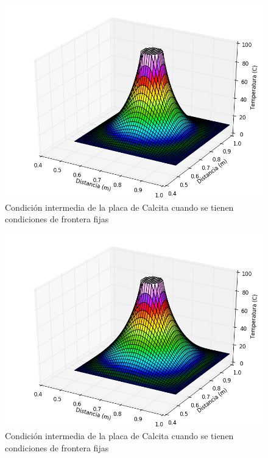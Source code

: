 \documentclass[]{article}
\begin{document}
\begin{figure}[H]
    \centering
    \includegraphics[width=\linewidth]{placafijaintermedio1.png}
    \caption{Condición intermedia de la placa de Calcita cuando se tienen condiciones de frontera fijas}
    \label{fig:placafijaintermedio1}
\end{figure}

\begin{figure}[H]
    \centering
    \includegraphics[width=\linewidth]{placafijaintermedio2.png}
    \caption{Condición intermedia de la placa de Calcita cuando se tienen condiciones de frontera fijas}
    \label{fig:placafijaintermedio2}
\end{figure}
\end{document}
